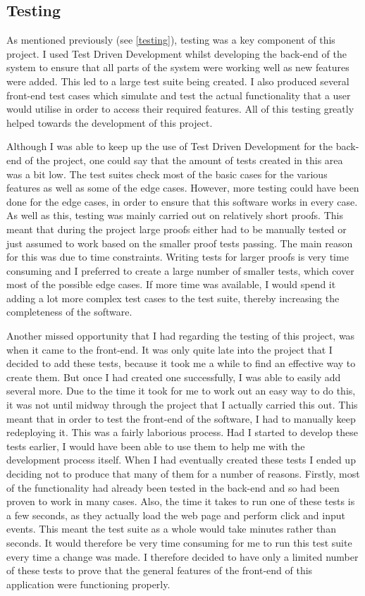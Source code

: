 \subsection{Testing}
As mentioned previously (see \ref{testing}), testing was a key component of this project. I used Test Driven Development whilst developing the back-end of the system to ensure that all parts of the system were working well as new features were added. This led to a large test suite being created. I also produced several front-end test cases which simulate and test the actual functionality that a user would utilise in order to access their required features. All of this testing greatly helped towards the development of this project.

Although I was able to keep up the use of Test Driven Development for the back-end of the project, one could say that the amount of tests created in this area was a bit low. The test suites check most of the basic cases for the various features as well as some of the edge cases. However, more testing could have been done for the edge cases, in order to ensure that this software works in every case. As well as this, testing was mainly carried out on relatively short proofs. This meant that during the project large proofs either had to be manually tested or just assumed to work based on the smaller proof tests passing. The main reason for this was due to time constraints. Writing tests for larger proofs is very time consuming and I preferred to create a large number of smaller tests, which cover most of the possible edge cases. If more time was available, I would spend it adding a lot more complex test cases to the test suite, thereby increasing the completeness of the software.

Another missed opportunity that I had regarding the testing of this project, was when it came to the front-end. It was only quite late into the project that I decided to add these tests, because it took me a while to find an effective way to create them. But once I had created one successfully, I was able to easily add several more. Due to the time it took for me to work out an easy way to do this, it was not until midway through the project that I actually carried this out. This meant that in order to test the front-end of the software, I had to manually keep redeploying it. This was a fairly laborious process. Had I started to develop these tests earlier, I would have been able to use them to help me with the development process itself. When I had eventually created these tests I ended up deciding not to produce that many of them for a number of reasons. Firstly, most of the functionality had already been tested in the back-end and so had been proven to work in many cases. Also, the time it takes to run one of these tests is a few seconds, as they actually load the web page and perform click and input events. This meant the test suite as a whole would take minutes rather than seconds. It would therefore be very time consuming for me to run this test suite every time a change was made. I therefore decided to have only a limited number of these tests to prove that the general features of the front-end of this application were functioning properly.

